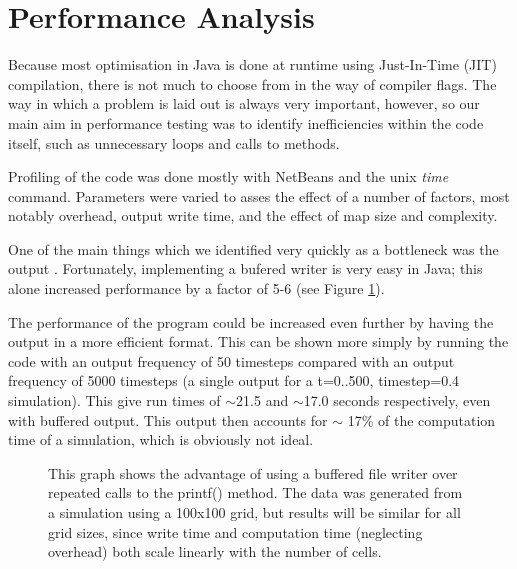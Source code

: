 \section{Performance Analysis} %
   
    Because most optimisation in Java is done at runtime using Just-In-Time (JIT) compilation, there is not much to choose from in the way
  	 of compiler flags. The way in which a problem is laid out is always very important, however, so our main aim in performance testing
 	 was to identify inefficiencies within the code itself, such as unnecessary loops and calls to methods.\newline{}
 	
 	 Profiling of the code was done mostly with NetBeans and the unix \emph{time} command. Parameters were varied to asses the effect of a number of 
 	 factors, most notably overhead, output write time, and the effect of map size and complexity.\newline{}
 
 	 One of the main things which we identified	very quickly as a bottleneck was the output . Fortunately, implementing a bufered writer is
	 very easy in Java; this alone increased performance by a factor of 5-6 (see Figure \ref{buffering}).\newline{}
	 
	The performance of the program could be increased even further by having the output in a more efficient format. This can be shown more 
   simply by running the code with an output frequency of 50 timesteps compared with an output frequency of 5000 timesteps (a single output for a t=0..500, timestep=0.4
   simulation). This give run times of $\sim$21.5 and $\sim$17.0 seconds respectively, even with buffered output. This output then accounts for 
   $\sim$ 17\% of the computation time of a simulation, which is obviously not ideal.  \newline{}

	
  \begin{figure}[h]
  \begin{center}
  
  \caption{\label{buffering}This graph shows the advantage of using a buffered file writer over repeated calls to the printf() method. 
  The data was generated from a simulation using a 100x100 grid, but results will be similar for all grid sizes, since write time and computation
  time (neglecting overhead) both scale linearly with the number of cells.}
  \end{center}
  \end{figure} 

